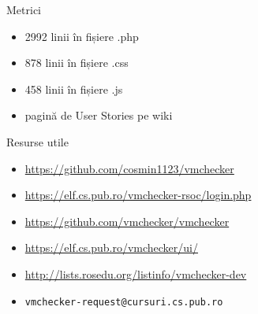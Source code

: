 \documentclass{beamer}
\begin{document}
\begin{frame}{Metrici}
  \begin{itemize}
    \item 2992 linii în fișiere .php
    \item 878 linii în fișiere .css
    \item 458 linii în fișiere .js
    \item pagină de User Stories pe wiki
  \end{itemize}
\end{frame}

\begin{frame}{Resurse utile}
  \begin{itemize}
    \item \url{https://github.com/cosmin1123/vmchecker}
    \item \url{https://elf.cs.pub.ro/vmchecker-rsoc/login.php}
    \item \url{https://github.com/vmchecker/vmchecker}
    \item \url{https://elf.cs.pub.ro/vmchecker/ui/}
    \item \url{http://lists.rosedu.org/listinfo/vmchecker-dev}
    \item \texttt{vmchecker-request@cursuri.cs.pub.ro}
  \end{itemize}
\end{frame}
\end{document}
